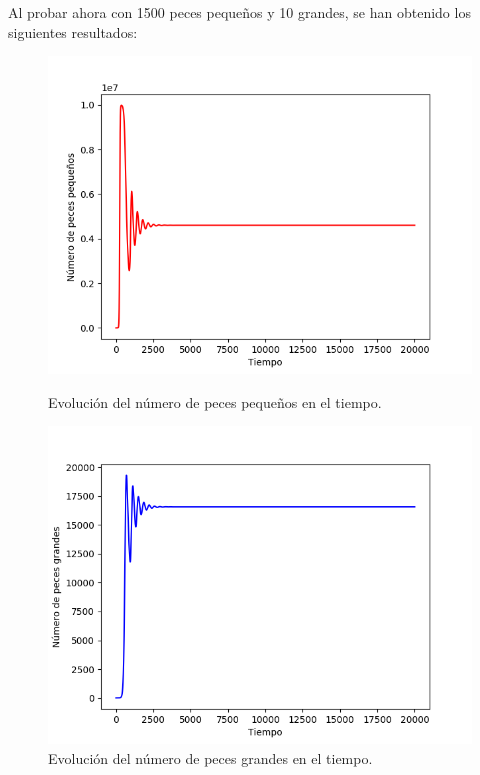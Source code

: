 \documentclass[11pt,a4paper]{report}
\begin{document}
Al probar ahora con 1500 peces pequeños y 10 grandes, se han obtenido los siguientes resultados:

\begin{figure}[H]
\centering
\begin{minipage}{.5\textwidth}
  \centering
  \includegraphics[scale=0.4]{img/peces-1500-1.png}
  \caption{Evolución del número de peces pequeños en el tiempo.}
  \label{fig:peces-1500-p}
\end{minipage}%
\begin{minipage}{.5\textwidth}
  \centering
  \includegraphics[scale=0.4]{img/peces-1500-2.png}
  \caption{Evolución del número de peces grandes en el tiempo.}
  \label{fig:peces-1500-g}
\end{minipage}
\end{figure}
\end{document}
